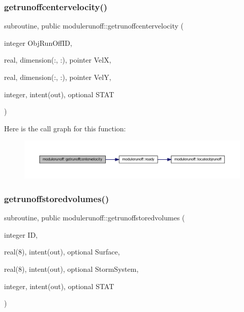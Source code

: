 \subsubsection{\texorpdfstring{getrunoffcentervelocity()}{getrunoffcentervelocity()}}
{\footnotesize\ttfamily subroutine, public modulerunoff\+::getrunoffcentervelocity (\begin{DoxyParamCaption}\item[{integer}]{Obj\+Run\+Off\+ID,  }\item[{real, dimension(\+:, \+:), pointer}]{VelX,  }\item[{real, dimension(\+:, \+:), pointer}]{VelY,  }\item[{integer, intent(out), optional}]{S\+T\+AT }\end{DoxyParamCaption})}

Here is the call graph for this function\+:
\nopagebreak
\begin{figure}[H]
\begin{center}
\leavevmode
\includegraphics[width=350pt]{namespacemodulerunoff_af29a57ef10a724fc9c8e0a4f1f22339e_cgraph}
\end{center}
\end{figure}
\mbox{\label{namespacemodulerunoff_a9d8c0b3cb553adb36c76cde2d6bcaef7}} 
\subsubsection{\texorpdfstring{getrunoffstoredvolumes()}{getrunoffstoredvolumes()}}
{\footnotesize\ttfamily subroutine, public modulerunoff\+::getrunoffstoredvolumes (\begin{DoxyParamCaption}\item[{integer}]{ID,  }\item[{real(8), intent(out), optional}]{Surface,  }\item[{real(8), intent(out), optional}]{Storm\+System,  }\item[{integer, intent(out), optional}]{S\+T\+AT }\end{DoxyParamCaption})}

